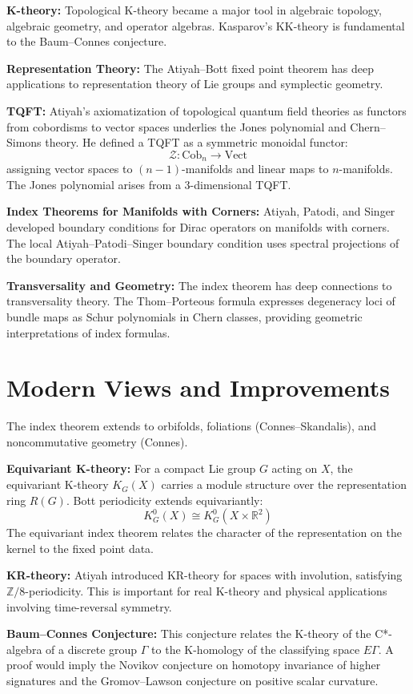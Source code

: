 \textbf{K-theory:} Topological K-theory became a major tool in algebraic
topology, algebraic geometry, and operator algebras. Kasparov's KK-theory is
fundamental to the Baum--Connes conjecture.

\textbf{Representation Theory:} The Atiyah--Bott fixed point theorem has deep
applications to representation theory of Lie groups and symplectic geometry.

\textbf{TQFT:} Atiyah's axiomatization of topological quantum field theories as
functors from cobordisms to vector spaces underlies the Jones polynomial and
Chern--Simons theory. He defined a TQFT as a symmetric monoidal functor:
\[\mathcal{Z}: \text{Cob}_n \to \text{Vect}\]
assigning vector spaces to $(n-1)$-manifolds and linear maps to $n$-manifolds.
The Jones polynomial arises from a 3-dimensional TQFT.

\textbf{Index Theorems for Manifolds with Corners:}
Atiyah, Patodi, and Singer developed boundary conditions for Dirac operators
on manifolds with corners. The local Atiyah--Patodi--Singer boundary condition
uses spectral projections of the boundary operator.

\textbf{Transversality and Geometry:}
The index theorem has deep connections to transversality theory. The
Thom--Porteous formula expresses degeneracy loci of bundle maps as
Schur polynomials in Chern classes, providing geometric interpretations
of index formulas.

\section{Modern Views and Improvements}

The index theorem extends to orbifolds, foliations (Connes--Skandalis), and
noncommutative geometry (Connes).

\textbf{Equivariant K-theory:} For a compact Lie group $G$ acting on $X$, the
equivariant K-theory $K_G(X)$ carries a module structure over the representation
ring $R(G)$. Bott periodicity extends equivariantly:
\[K_G^0(X) \cong K_G^0(X \times \mathbb{R}^2)\]
The equivariant index theorem relates the character of the representation on
the kernel to the fixed point data.

\textbf{KR-theory:} Atiyah introduced KR-theory for spaces with involution,
satisfying $\mathbb{Z}/8$-periodicity. This is important for real K-theory and
physical applications involving time-reversal symmetry.

\textbf{Baum--Connes Conjecture:} This conjecture relates the K-theory of the
C*-algebra of a discrete group $\Gamma$ to the K-homology of the classifying
space $E\Gamma$. A proof would imply the Novikov conjecture on homotopy
invariance of higher signatures and the Gromov--Lawson conjecture on positive
scalar curvature.

